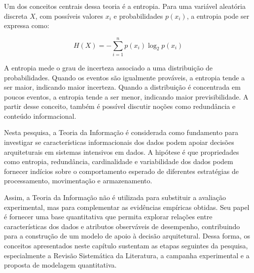 Um dos conceitos centrais dessa teoria é a entropia. Para uma variável aleatória discreta $X$, com possíveis valores $x_i$ e probabilidades $p(x_i)$, a entropia pode ser expressa como:

\begin{equation}
H(X) = - \sum_{i=1}^{n} p(x_i) \log_2 p(x_i)
\label{eq:entropia-fundamentacao}
\end{equation}

A entropia mede o grau de incerteza associado a uma distribuição de probabilidades. Quando os eventos são igualmente prováveis, a entropia tende a ser maior, indicando maior incerteza. Quando a distribuição é concentrada em poucos eventos, a entropia tende a ser menor, indicando maior previsibilidade. A partir desse conceito, também é possível discutir noções como redundância e conteúdo informacional.

Nesta pesquisa, a Teoria da Informação é considerada como fundamento para investigar se características informacionais dos dados podem apoiar decisões arquiteturais em sistemas intensivos em dados. A hipótese é que propriedades como entropia, redundância, cardinalidade e variabilidade dos dados podem fornecer indícios sobre o comportamento esperado de diferentes estratégias de processamento, movimentação e armazenamento.

Assim, a Teoria da Informação não é utilizada para substituir a avaliação experimental, mas para complementar as evidências empíricas obtidas. Seu papel é fornecer uma base quantitativa que permita explorar relações entre características dos dados e atributos observáveis de desempenho, contribuindo para a construção de um modelo de apoio à decisão arquitetural. Dessa forma, os conceitos apresentados neste capítulo sustentam as etapas seguintes da pesquisa, especialmente a Revisão Sistemática da Literatura, a campanha experimental e a proposta de modelagem quantitativa.
